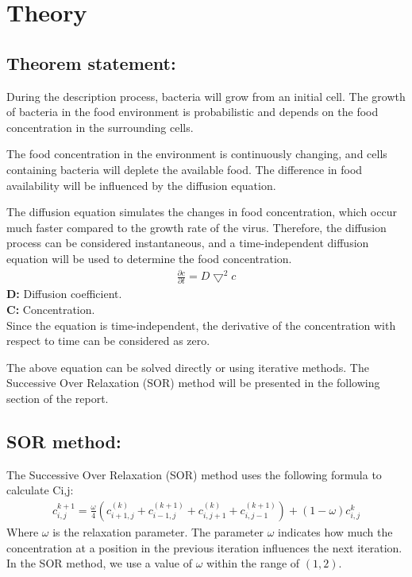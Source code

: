 \documentclass[a4paper,10pt,notitlepage]{article}
\begin{document}
{\section{\textbf{Theory}}
\subsection{Theorem statement:}
{\setlength{\parskip}{0.5cm}
\label{sec:TS}
\hspace{1 cm}During the description process, bacteria will grow from an initial cell. The growth of bacteria in the food environment is probabilistic and depends on the food concentration in the surrounding cells.

The food concentration in the environment is continuously changing, and cells containing bacteria will deplete the available food. The difference in food availability will be influenced by the diffusion equation.

The diffusion equation simulates the changes in food concentration, which occur much faster compared to the growth rate of the virus. Therefore, the diffusion process can be considered instantaneous, and a time-independent diffusion equation will be used to determine the food concentration.
\begin{eqnarray} 
    \frac{\partial c}{\partial t} = D\bigtriangledown^2c
\end{eqnarray}
\normalsize
					\hspace{8cm}\textbf{D:} Diffusion coefficient.\\
					\hspace{7cm}\textbf{C:} Concentration.\\
\large
Since the equation is time-independent, the derivative of the concentration with respect to time can be considered as zero.

The above equation can be solved directly or using iterative methods. The Successive Over Relaxation (SOR) method will be presented in the following section of the report.
\subsection{SOR method:}
{\setlength{\parskip}{0.5cm}
\vspace{-0.5cm}
\hspace{1 cm}The Successive Over Relaxation (SOR) method uses the following formula to calculate Ci,j:
\begin{eqnarray}
    c^{k+1}_{i, j} = \frac{\omega}{4} \left( c^{(k)}_{i+1, j} + c^{(k+1)}_{i-1, j} + c^{(k)}_{i, j+1} + c^{(k+1)}_{i, j-1} \right) + (1-\omega)c^{k}_{i, j}
\end{eqnarray}
\hspace{1 cm}Where $\omega$ is the relaxation parameter. The parameter $\omega$ indicates how much the concentration at a position in the previous iteration influences the next iteration. In the SOR method, we use a value of $\omega$ within the range of $(1, 2)$.

}}}
\end{document}

